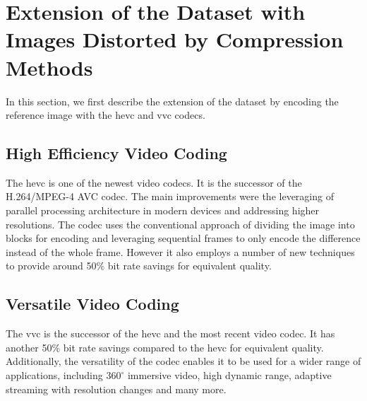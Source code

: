 \section{Extension of the Dataset with Images Distorted by Compression Methods}
\label{sec:dataset_codec}

In this section, we first describe the extension of the dataset by encoding the reference image with the \gls{hevc} and \gls{vvc} codecs.

\subsection{High Efficiency Video Coding}
\label{subsec:hevc}

The \gls{hevc} \cite{hevc_2012} is one of the newest video codecs.
It is the successor of the H.264/MPEG-4 AVC codec.
The main improvements were the leveraging of parallel processing architecture in modern devices and addressing higher resolutions.
The codec uses the conventional approach of dividing the image into blocks for encoding and leveraging sequential frames to only encode the difference instead of the whole frame.
However it also employs a number of new techniques to provide around 50\% bit rate savings for equivalent quality.

\subsection{Versatile Video Coding}
\label{subsec:vvc}

The \gls{vvc} \cite{vvc_2021} is the successor of the \gls{hevc} and the most recent video codec.
It has another 50\% bit rate savings compared to the \gls{hevc} for equivalent quality.
Additionally, the versatility of the codec enables it to be used for a wider range of applications, including $360^{\circ}$ immersive video, high dynamic range, adaptive streaming with resolution changes and many more.


